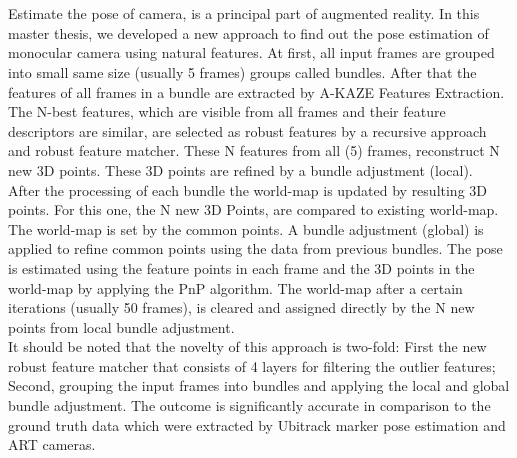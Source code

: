 \chapter{\abstractname}
Estimate the pose of camera, is a principal part of augmented reality. In this master thesis, we developed a new approach to find out the pose estimation of monocular camera using natural features. At first, all input frames are grouped into small same size (usually 5 frames) groups called bundles. After that the features of all frames in a bundle are extracted by A-KAZE Features Extraction. The N-best features, which are visible from all frames and their feature descriptors are similar, are selected as robust features by a recursive approach and robust feature matcher. These N features from all (5) frames, reconstruct N new 3D points. These 3D points are refined by a bundle adjustment (local).\\
After the processing of each bundle the world-map is updated by resulting 3D points. For this one, the N new 3D Points, are compared to existing world-map. The world-map is set by the common points. A bundle adjustment (global) is applied to refine common points using the data from previous bundles. The pose is estimated using the feature points in each frame and the 3D points in the world-map by applying the PnP algorithm. The world-map after a certain iterations (usually 50 frames), is cleared and assigned directly by the N new points from local bundle adjustment.\\
It should be noted that the novelty of this approach is two-fold: First the new robust feature matcher that consists of 4 layers for filtering the outlier features; Second, grouping the input frames into bundles and applying the local and global bundle adjustment. The outcome is significantly accurate in comparison to the ground truth data which were extracted by Ubitrack marker pose estimation and ART cameras.